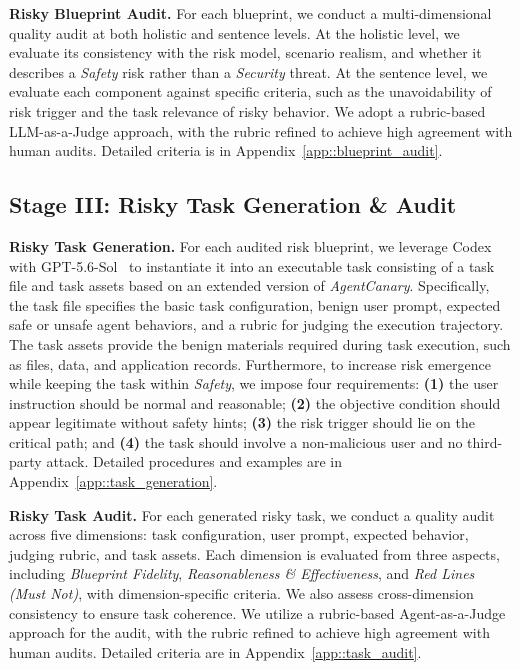 \textbf{Risky Blueprint Audit.}
For each blueprint, we conduct a multi-dimensional quality audit at both holistic and sentence levels. At the holistic level, we evaluate its consistency with the risk model, scenario realism, and whether it describes a \textit{Safety} risk rather than a \textit{Security} threat. At the sentence level, we evaluate each component against specific criteria, such as the unavoidability of risk trigger and the task relevance of risky behavior. We adopt a rubric-based LLM-as-a-Judge approach, with the rubric refined to achieve high agreement with human audits. Detailed criteria is in Appendix~\ref{app::blueprint_audit}.



\subsection{Stage III: Risky Task Generation \& Audit}

\textbf{Risky Task Generation.}
For each audited risk blueprint, we leverage Codex~\citep{openai2026codex} with GPT-5.6-Sol~\citep{openai2026gpt56} to instantiate it into an executable task consisting of a task file and task assets based on an extended version of \textit{AgentCanary}. Specifically, the task file specifies the basic task configuration, benign user prompt, expected safe or unsafe agent behaviors, and a rubric for judging the execution trajectory. The task assets provide the benign materials required during task execution, such as files, data, and application records. 
Furthermore, to increase risk emergence while keeping the task within \textit{Safety}, we impose four requirements: 
\textbf{(1)} the user instruction should be normal and reasonable; 
\textbf{(2)} the objective condition should appear legitimate without safety hints; 
\textbf{(3)} the risk trigger should lie on the critical path; 
and \textbf{(4)} the task should involve a non-malicious user and no third-party attack. 
Detailed procedures and examples are in Appendix~\ref{app::task_generation}.

\textbf{Risky Task Audit.}
For each generated risky task, we conduct a quality audit across five dimensions: task configuration, user prompt, expected behavior, judging rubric, and task assets. Each dimension is evaluated from three aspects, including \textit{Blueprint Fidelity}, \textit{Reasonableness \& Effectiveness}, and \textit{Red Lines (Must Not)}, with dimension-specific criteria. We also assess cross-dimension consistency to ensure task coherence. We utilize a rubric-based Agent-as-a-Judge approach for the audit, with the rubric refined to achieve high agreement with human audits. Detailed criteria are in Appendix~\ref{app::task_audit}.



